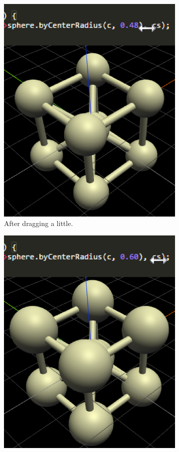 \begin{figure}
\begin{subfigure}[b]{0.3\linewidth}
    \includegraphics[width=1.0\linewidth]{./images/literal_adjustment/middle_crop}
    \caption{After dragging a little.}
  \end{subfigure}
  \begin{subfigure}[b]{0.3\linewidth}
    \includegraphics[width=1.0\linewidth]{./images/literal_adjustment/end_crop}

\end{subfigure}
\end{figure}
